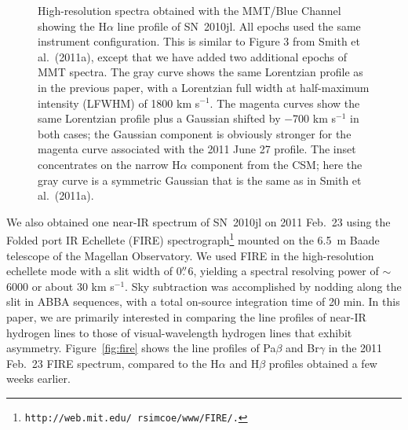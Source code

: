 \documentclass{emulateapj}
\begin{document}
\begin{figure}
\caption{High-resolution spectra obtained with the MMT/Blue Channel showing
  the H$\alpha$ line profile of SN~2010jl.  All epochs used the same
  instrument configuration.  This is similar to Figure 3 from Smith
  et al.\ (2011a), except that we have added two additional epochs of
  MMT spectra.  The gray curve shows the same Lorentzian profile as in
  the previous paper, with a Lorentzian full width at half-maximum 
  intensity (LFWHM) of 1800 km s$^{-1}$. The magenta curves show the same
  Lorentzian profile plus a Gaussian shifted by $-$700 km s$^{-1}$ in
  both cases; the Gaussian component is obviously stronger for the
  magenta curve associated with the 2011 June 27 profile.  The inset
  concentrates on the narrow H$\alpha$ component from the CSM; here the
  gray curve is a symmetric Gaussian that is the same as in Smith et
  al.\ (2011a).}
\label{fig:ha2}
\end{figure}


We also obtained one near-IR spectrum of SN~2010jl on
2011 Feb.\ 23 using the Folded port IR Echellete (FIRE)
spectrograph\footnote{\tt http://web.mit.edu/~rsimcoe/www/FIRE/.}
mounted on the 6.5~m Baade telescope of the Magellan Observatory.  We
used FIRE in the high-resolution echellete mode with a slit width of
0$\mbox{$.\!\!^{\prime\prime}$}$6, yielding a spectral resolving power of $\sim$6000 or about
30 km s$^{-1}$.  Sky subtraction was accomplished by nodding along the
slit in ABBA sequences, with a total on-source integration time of 20
min.  In this paper, we are primarily interested in comparing the line
profiles of near-IR hydrogen lines to those of visual-wavelength
hydrogen lines that exhibit asymmetry.  Figure~\ref{fig:fire} shows the
line profiles of Pa$\beta$ and Br$\gamma$ in the 2011 Feb.\ 23 FIRE
spectrum, compared to the H$\alpha$ and H$\beta$ profiles obtained a
few weeks earlier.
\end{document}
